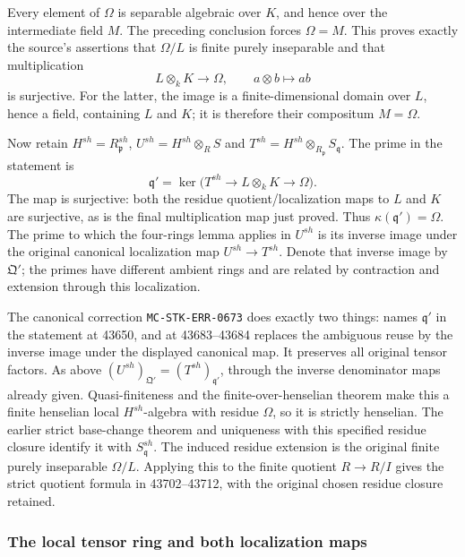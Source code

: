Every element of \(\Omega\) is separable algebraic over \(K\), and hence over the intermediate field \(M\). The preceding conclusion forces \(\Omega=M\). This proves exactly the source's assertions that \(\Omega/L\) is finite purely inseparable and that multiplication \[
 L\otimes_k K\longrightarrow\Omega,\qquad a\otimes b\longmapsto ab
\] is surjective. For the latter, the image is a finite-dimensional domain over \(L\), hence a field, containing \(L\) and \(K\); it is therefore their compositum \(M=\Omega\).

Now retain \(H^{sh}=R_{\mathfrak p}^{sh}\), \(U^{sh}=H^{sh}\otimes_R S\) and \(T^{sh}=H^{sh}\otimes_{R_{\mathfrak p}}S_{\mathfrak q}\). The prime in the statement is \[
 \mathfrak q'=\ker\bigl(T^{sh}\longrightarrow L\otimes_k K
                                     \longrightarrow\Omega\bigr).
\] The map is surjective: both the residue quotient/localization maps to \(L\) and \(K\) are surjective, as is the final multiplication map just proved. Thus \(\kappa(\mathfrak q')=\Omega\). The prime to which the four-rings lemma applies in \(U^{sh}\) is its inverse image under the original canonical localization map \(U^{sh}\to T^{sh}\). Denote that inverse image by \(\mathfrak Q'\); the primes have different ambient rings and are related by contraction and extension through this localization.

The canonical correction \texttt{MC-STK-ERR-0673} does exactly two things: names \(\mathfrak q'\) in the statement at 43650, and at 43683--43684 replaces the ambiguous reuse by the inverse image under the displayed canonical map. It preserves all original tensor factors. As above \((U^{sh})_{\mathfrak Q'}=(T^{sh})_{\mathfrak q'}\), through the inverse denominator maps already given. Quasi-finiteness and the finite-over-henselian theorem make this a finite henselian local \(H^{sh}\)-algebra with residue \(\Omega\), so it is strictly henselian. The earlier strict base-change theorem and uniqueness with this specified residue closure identify it with \(S_{\mathfrak q}^{sh}\). The induced residue extension is the original finite purely inseparable \(\Omega/L\). Applying this to the finite quotient \(R\to R/I\) gives the strict quotient formula in 43702--43712, with the original chosen residue closure retained.

\subsubsection{The local tensor ring and both localization maps}\label{algebra-proof-061-the-local-tensor-ring-and-both-localization-maps}

